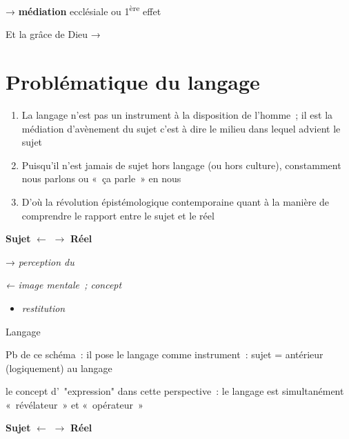 → \textbf{médiation} ecclésiale ou 1\textsuperscript{ère} effet

Et la grâce de Dieu →

  \section{Problématique du langage} 

\begin{Synthesis}
    \begin{enumerate}
  \item
    {La langage n'est pas un instrument à la disposition de
    l'homme~; il est la médiation d'avènement du sujet c'est à dire le
    milieu dans lequel advient le sujet}
  \item
    {Puisqu'il n'est jamais de sujet hors langage (ou hors
    culture), constamment nous parlons ou «~ça parle~» en nous} 

 
  \item
    {D'où la révolution épistémologique contemporaine quant à la
    manière de comprendre le rapport entre le sujet et le réel}
  \end{enumerate}
\end{Synthesis}


\textbf{Sujet} $\leftarrow$ $\rightarrow$ \textbf{Réel}

→ \emph{perception du}

\emph{← image mentale~; concept}

\begin{itemize}
\item
  \emph{restitution}
\end{itemize}

Langage

Pb de ce schéma~: il pose le langage comme instrument~: sujet =
antérieur (logiquement) au langage


\begin{Prop}
    {le concept d'~"expression" dans cette perspective~: le
  langage est simultanément «~révélateur~» et «~opérateur~»}
\end{Prop}



\textbf{Sujet} $\leftarrow$ $\rightarrow$ \textbf{Réel}

